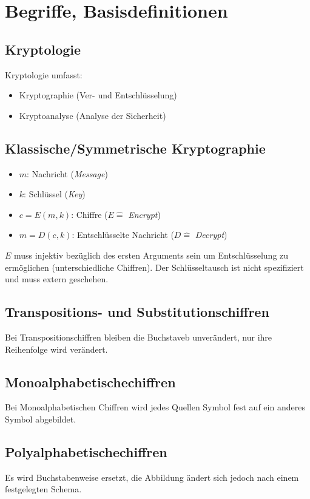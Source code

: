 \chapter{Begriffe, Basisdefinitionen}
\section{Kryptologie}
Kryptologie umfasst:
\begin{itemize}
    \item Kryptographie (Ver- und Entschlüsselung)
    \item Kryptoanalyse (Analyse der Sicherheit)
\end{itemize}

\section{Klassische/Symmetrische Kryptographie}
\begin{itemize}
    \item $m$: Nachricht (\textit{Message})
    \item $k$: Schlüssel (\textit{Key})
    \item $c=E(m,k)$: Chiffre ($E \hat{=}$ \textit{Encrypt}) 
    \item $m=D(c,k)$: Entschlüsselte Nachricht ($D \hat{=}$ \textit{Decrypt})
\end{itemize}
$E$ muss injektiv bezüglich des ersten Arguments sein um Entschlüsselung zu ermöglichen (unterschiedliche Chiffren).
Der Schlüsseltausch ist nicht spezifiziert und muss extern geschehen.

\section{Transpositions- und Substitutionschiffren}
Bei Transpositionschiffren bleiben die Buchstaveb unverändert, nur ihre Reihenfolge wird verändert.

\section{Monoalphabetischechiffren}
Bei Monoalphabetischen Chiffren wird jedes Quellen Symbol fest auf ein anderes Symbol abgebildet.

\section{Polyalphabetischechiffren}
Es wird Buchstabenweise ersetzt, die Abbildung ändert sich jedoch nach einem festgelegten Schema.

